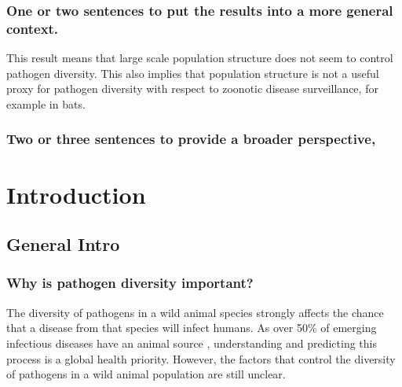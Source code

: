 \subsubsection{One or two sentences to put the results into a more general context.}
This result means that large scale population structure does not seem to control pathogen diversity.
This also implies that population structure is not a useful proxy for pathogen diversity with respect to zoonotic disease surveillance, for example in bats.


\subsubsection{Two or three sentences to provide a broader perspective, }






\clearpage
\section{Introduction}





\subsection{General Intro}


\subsubsection{Why is pathogen diversity important?}

The diversity of pathogens in a wild animal species strongly affects the chance that a disease from that species will infect humans.
As over 50\% of emerging infectious diseases have an animal source  \cite{jones2008global}, understanding and predicting this process is a global health priority.
However, the factors that control the diversity of pathogens in a wild animal population are still unclear.


